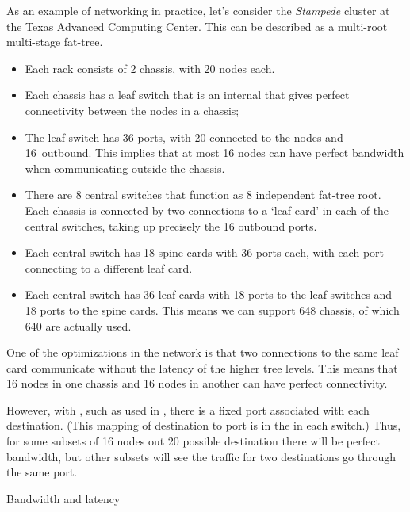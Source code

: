 As an example of networking in practice, let's consider the
\emph{Stampede} cluster at the Texas
Advanced Computing Center. This can be described as a multi-root
multi-stage fat-tree.
\begin{itemize}
\item Each rack consists of 2 chassis, with 20 nodes each.
\item Each chassis has a leaf switch that is an internal
   that gives perfect connectivity between the
  nodes in a chassis;
\item The leaf switch has 36 ports, with 20 connected to the nodes and
  16~outbound. This  implies that at most
  16 nodes can have perfect bandwidth when communicating outside the
  chassis.
\item There are 8 central switches that function as 8 independent
  fat-tree root. Each chassis is connected by two connections to a
  `leaf card' in each
  of the central switches, taking up precisely the 16 outbound ports.
\item Each central switch has 18 spine cards with 36 ports each, with
  each port connecting to a different leaf card.
\item Each central switch has 36 leaf cards with 18 ports to the leaf switches
  and 18 ports to the spine cards. This means we can support 648
  chassis, of which 640 are actually used.
\end{itemize}
One of the optimizations in the network is that two connections to the
same leaf card communicate without the latency of the higher tree levels.
This means that 16 nodes in one chassis and 16 nodes in another can
have perfect connectivity.

However, with
, such as used in ,
there is a fixed port associated with each destination. (This mapping
of destination to port is in the  in
each switch.) Thus, for some subsets of 16 nodes out 20 possible
destination there will be perfect bandwidth, but other subsets will
see the traffic for two destinations go through the same port.

 {Bandwidth and latency}
\label{sec:bwlatency}

